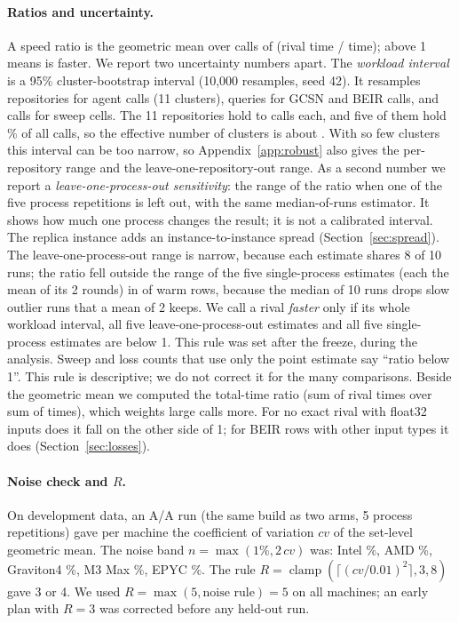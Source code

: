 \paragraph{Ratios and uncertainty.}
A speed ratio is the geometric mean over calls of (rival time / \sweet time); above 1 means \sweet is faster.
We report two uncertainty numbers apart.
The \emph{workload interval} is a 95\% cluster-bootstrap interval (10,000 resamples, seed 42).
It resamples repositories for agent calls (11 clusters), queries for GCSN and BEIR calls, and calls for sweep cells.
The 11 repositories hold  to  calls each, and five of them hold \% of all calls, so the effective number of clusters is about .
With so few clusters this interval can be too narrow, so Appendix~\ref{app:robust} also gives the per-repository range and the leave-one-repository-out range.
As a second number we report a \emph{leave-one-process-out sensitivity}: the range of the ratio when one of the five process repetitions is left out, with the same median-of-runs estimator. It shows how much one process changes the result; it is not a calibrated interval.
The replica instance adds an instance-to-instance spread (Section~\ref{sec:spread}).
The leave-one-process-out range is narrow, because each estimate shares 8 of 10 runs; the ratio fell outside the range of the five single-process estimates (each the mean of its 2 rounds) in  of  warm rows, because the median of 10 runs drops slow outlier runs that a mean of 2 keeps.
We call a rival \emph{faster} only if its whole workload interval, all five leave-one-process-out estimates and all five single-process estimates are below 1. This rule was set after the freeze, during the analysis. Sweep and loss counts that use only the point estimate say ``ratio below 1''.
This rule is descriptive; we do not correct it for the many comparisons.
Beside the geometric mean we computed the total-time ratio (sum of rival times over sum of \sweet times), which weights large calls more.
For no exact rival with float32 inputs does it fall on the other side of 1; for  BEIR rows with other input types it does (Section~\ref{sec:losses}).

\paragraph{Noise check and $R$.}
On development data, an A/A run (the same build as two arms, 5 process repetitions) gave per machine the coefficient of variation $cv$ of the set-level geometric mean.
The noise band $n = \max(1\%, 2\,cv)$ was: Intel \%, AMD \%, Graviton4 \%, M3 Max \%, EPYC \%.
The rule $R = \operatorname{clamp}(\lceil (cv/0.01)^2\rceil, 3, 8)$ gave 3 or 4.
We used $R = \max(5, \text{noise rule}) = 5$ on all machines; an early plan with $R = 3$ was corrected before any held-out run.

